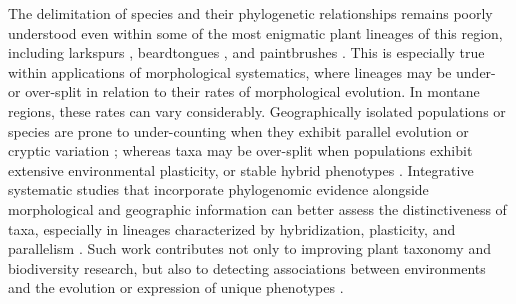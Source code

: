 \documentclass[11pt]{article}
\begin{document}
The delimitation of species and their phylogenetic relationships remains poorly
understood even within some of the most enigmatic plant lineages of this region, 
including 
larkspurs \citep[\emph{Delphinium};][]{jabbour_phylogeny_2012, xiang_recircumscription_2017}, 
beardtongues \citep[\emph{Penstemon};][]{wessinger_multiplexed_2016,wolfe_phylogenetics_2021},
and paintbrushes \citep[\emph{Castilleja;}][]{tank_phylogenetic_2009,jacobs_quantifying_2019}.
% 
% 
This is especially true within applications of morphological systematics, where lineages
may be under- or over-split in relation to their rates of morphological evolution.
% 
In montane regions, these rates can vary considerably. Geographically isolated
populations or species are prone to under-counting when they exhibit parallel
evolution or cryptic variation
\citep[e.g.,][]{donoghue_replicated_2022}; 
whereas taxa may be over-split when populations exhibit extensive environmental
plasticity, or stable hybrid phenotypes \citep{divittorio_natural_2020}.
% 
% 
% 
% 
Integrative systematic studies that incorporate phylogenomic evidence alongside
morphological and geographic information can better assess the distinctiveness of
taxa, especially in lineages characterized by hybridization, plasticity, and 
parallelism \citep[e.g.,][]{donoghue_replicated_2022,hipp_genomic_2020}.
% 
Such work contributes not only to improving plant taxonomy and biodiversity
research, but also to detecting associations between environments and the evolution or expression of unique phenotypes \citep{anstett_regional_2021, gross_unforeseen_2024,melton_draft_2021}.
\end{document}

